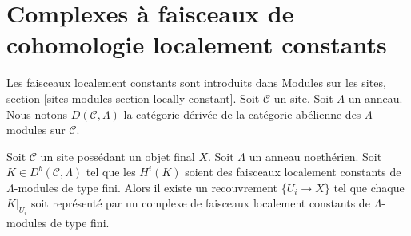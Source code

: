 \section{Complexes à faisceaux de cohomologie localement constants}
\label{section-locally-constant}

\noindent
Les faisceaux localement constants sont introduits dans Modules sur les sites,
section \ref{sites-modules-section-locally-constant}. Soit $\mathcal{C}$ un
site. Soit $\Lambda$ un anneau. Nous notons $D(\mathcal{C}, \Lambda)$ la
catégorie dérivée de la catégorie abélienne des
$\underline{\Lambda}$-modules sur $\mathcal{C}$.

\begin{lemma}
\label{lemma-locally-constant}
Soit $\mathcal{C}$ un site possédant un objet final $X$. Soit $\Lambda$ un
anneau noethérien. Soit $K \in D^b(\mathcal{C}, \Lambda)$ tel que les
$H^i(K)$ soient des faisceaux localement constants de $\Lambda$-modules de
type fini. Alors il existe un recouvrement $\{U_i \to X\}$ tel que chaque
$K|_{U_i}$ soit représenté par un complexe de faisceaux localement constants
de $\Lambda$-modules de type fini.
\end{lemma}

